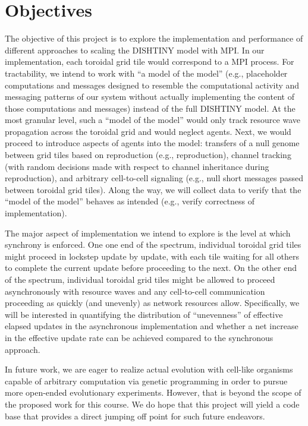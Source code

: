 \section{Objectives}

The objective of this project is to explore the implementation and performance of different approaches to scaling the DISHTINY model with MPI.
In our implementation, each toroidal grid tile would correspond to a MPI process.
For tractability, we intend to work with ``a model of the model'' (e.g., placeholder computations and messages designed to resemble the computational activity and messaging patterns of our system without actually implementing the content of those computations and messages) instead of the full DISHTINY model.
At the most granular level, such a ``model of the model'' would only track resource wave propagation across the toroidal grid and would neglect agents.
Next, we would proceed to introduce aspects of agents into the model: transfers of a null genome between grid tiles based on reproduction (e.g., reproduction), channel tracking (with random decisions made with respect to channel inheritance during reproduction), and arbitrary cell-to-cell signaling (e.g., null short messages passed between toroidal grid tiles).
Along the way, we will collect data to verify that the ``model of the model'' behaves as intended (e.g., verify correctness of implementation).

The major aspect of implementation we intend to explore is the level at which synchrony is enforced.
One one end of the spectrum, individual toroidal grid tiles might proceed in lockstep update by update, with each tile waiting for all others to complete the current update before proceeding to the next.
On the other end of the spectrum, individual toroidal grid tiles might be allowed to proceed asynchronously with resource waves and any cell-to-cell communication proceeding as quickly (and unevenly) as network resources allow.
Specifically, we will be interested in quantifying the distribution of ``unevenness'' of effective elapsed updates in the asynchronous implementation and whether a net increase in the effective update rate can be achieved compared to the synchronous approach.

In future work, we are eager to realize actual evolution with cell-like organisms capable of arbitrary computation via genetic programming in order to pursue more open-ended evolutionary experiments.
However, that is beyond the scope of the proposed work for this course.
We do hope that this project will yield a code base that provides a direct jumping off point for such future endeavors.
